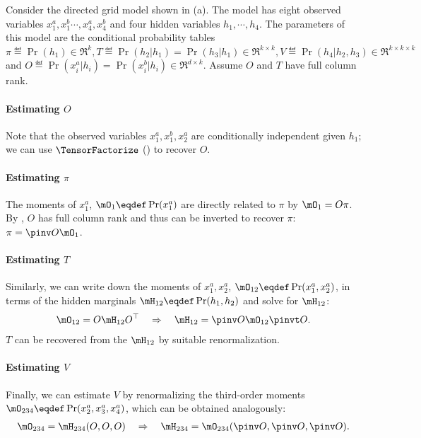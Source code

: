 Consider the directed grid model shown in (a).
The model has eight observed variables $x^a_1, x^b_1 \cdots, x^a_4, x^b_4$ and four
  hidden variables $h_1, \cdots, h_4$.
The parameters of this model are the conditional probability tables
$\pi \eqdef \Pr(h_1) \in \Re^k, T \eqdef \Pr(h_2 | h_1) = \Pr(h_3 | h_1) \in \Re^{k \times k},
V \eqdef \Pr(h_4 | h_2, h_3) \in \Re^{k \times k \times k}$ and $O \eqdef \Pr(x^a_i | h_i)
=  \Pr(x^b_i | h_i) \in \Re^{d \times k}$. 
Assume $O$ and $T$ have full column rank.

\paragraph{Estimating $O$}
Note that the observed variables $x^a_1, x^b_1, x^a_2$ are
  conditionally independent given $h_1$; we can use
  $\TensorFactorize$ () to recover $O$.

\paragraph{Estimating $\pi$}
The moments of $x^a_1$, $\mO_1 \eqdef \Pr(x^a_1)$ are directly related to
  $\pi$ by $\mO_1 = O \pi$. 
By , $O$ has full column rank and thus can be
  inverted to recover $\pi$: $\pi = \pinv O \mO_1$.

\paragraph{Estimating $T$}
Similarly, we can write down the moments of $x^a_1, x^a_2$, $\mO_{12}
  \eqdef \Pr(x^a_1, x^a_2)$, in terms of the hidden marginals $\mH_{12}
  \eqdef \Pr(h_1, h_2)$ and solve for $\mH_{12}$:
\begin{align*}
\mO_{12} = O \mH_{12} O^\top \quad\Rightarrow\quad
  \mH_{12} = \pinv O \mO_{12} \pinvt O.
\end{align*}
$T$ can be recovered from the $\mH_{12}$ by suitable renormalization.

\paragraph{Estimating $V$}
Finally, we can estimate $V$ by renormalizing the third-order moments $\mO_{234} \eqdef \Pr(x^a_2, x^a_3, x^a_4)$,
which can be obtained analogously:
\begin{align*}
  \mO_{234} = \mH_{234}(O, O, O) \quad\Rightarrow\quad
  \mH_{234} = \mO_{234}(\pinv O, \pinv O, \pinv O).
\end{align*}

